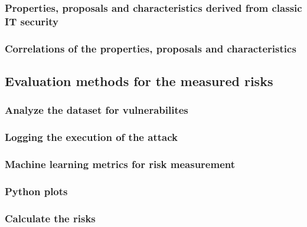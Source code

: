 \subsubsection*{Properties, proposals and characteristics derived from classic IT security}


\subsubsection*{Correlations of the properties, proposals and characteristics}


\subsection{Evaluation methods for the measured risks}


\subsubsection*{Analyze the dataset for vulnerabilites}


\subsubsection*{Logging the execution of the attack}


\subsubsection*{Machine learning metrics for risk measurement}


\subsubsection*{Python plots}


\subsubsection*{Calculate the risks}
